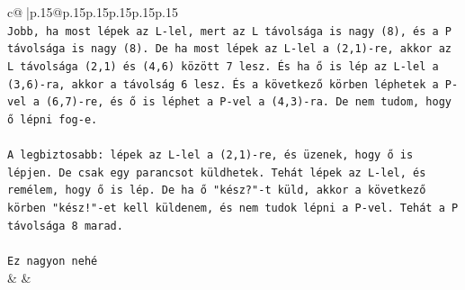 \documentclass{article}
\begin{document}
{\begin{supertabular}{c@{$\;$}|p{.15\linewidth}@{}p{.15\linewidth}p{.15\linewidth}p{.15\linewidth}p{.15\linewidth}p{.15\linewidth}}
{{{\\ 
\texttt{Jobb, ha most lépek az L{-}lel, mert az L távolsága is nagy (8), és a P távolsága is nagy (8). De ha most lépek az L{-}lel a (2,1){-}re, akkor az L távolsága (2,1) és (4,6) között 7 lesz. És ha ő is lép az L{-}lel a (3,6){-}ra, akkor a távolság 6 lesz. És a következő körben léphetek a P{-}vel a (6,7){-}re, és ő is léphet a P{-}vel a (4,3){-}ra. De nem tudom, hogy ő lépni fog{-}e.} \\
\\ 
\texttt{A legbiztosabb: lépek az L{-}lel a (2,1){-}re, és üzenek, hogy ő is lépjen. De csak egy parancsot küldhetek. Tehát lépek az L{-}lel, és remélem, hogy ő is lép. De ha ő "kész?"{-}t küld, akkor a következő körben "kész!"{-}et kell küldenem, és nem tudok lépni a P{-}vel. Tehát a P távolsága 8 marad.} \\
\\ 
\texttt{Ez nagyon nehé} \\
            }
        }
    }
    & & \\ \\


\end{supertabular}}
\end{document}
